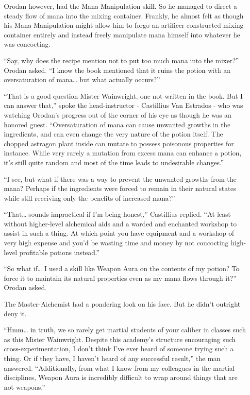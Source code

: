 \documentclass[a4paper,10pt]{book}
\begin{document}
Orodan however, had the Mana Manipulation skill. So he managed to direct a steady flow of mana into the mixing container. Frankly, he almost felt as though his Mana Manipulation might allow him to forgo an artificer-constructed mixing container entirely and instead freely manipulate mana himself into whatever he was concocting.\par
“Say, why does the recipe mention not to put too much mana into the mixer?” Orodan asked. “I know the book mentioned that it ruins the potion with an oversaturation of mana… but what actually occurs?”\par
“That is a good question Mister Wainwright, one not written in the book. But I can answer that,” spoke the head-instructor - Castillius Van Estrados - who was watching Orodan’s progress out of the corner of his eye as though he was an honored guest. “Oversaturation of mana can cause unwanted growths in the ingredients, and can even change the very nature of the potion itself. The chopped astragon plant inside can mutate to possess poisonous properties for instance. While very rarely a mutation from excess mana can enhance a potion, it’s still quite random and most of the time leads to undesirable changes.”\par
“I see, but what if there was a way to prevent the unwanted growths from the mana? Perhaps if the ingredients were forced to remain in their natural states while still receiving only the benefits of increased mana?”\par
“That… sounds impractical if I’m being honest,” Castillius replied. “At least without higher-level alchemical aids and a warded and enchanted workshop to assist in such a thing. At which point you have equipment and a workshop of very high expense and you’d be wasting time and money by not concocting high-level profitable potions instead.”\par
“So what if… I used a skill like Weapon Aura on the contents of my potion? To force it to maintain its natural properties even as my mana flows through it?” Orodan asked.\par
The Master-Alchemist had a pondering look on his face. But he didn’t outright deny it.\par
“Hmm… in truth, we so rarely get martial students of your caliber in classes such as this Mister Wainwright. Despite this academy’s structure encouraging such cross-experimentation, I don’t think I’ve ever heard of someone trying such a thing. Or if they have, I haven’t heard of any successful result,” the man answered. “Additionally, from what I know from my colleagues in the martial disciplines, Weapon Aura is incredibly difficult to wrap around things that are not weapons.”\par
\end{document}
